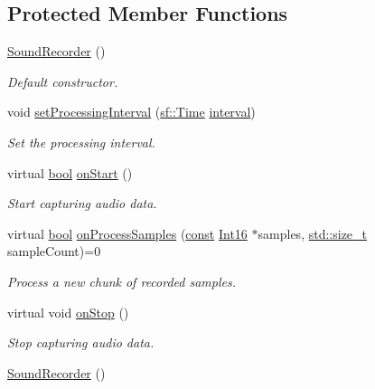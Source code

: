 \subsection*{Protected Member Functions}
\begin{DoxyCompactItemize}
\item 
\hyperlink{classsf_1_1_sound_recorder_a50ebad413c4f157408a0fa49f23212a9}{Sound\-Recorder} ()
\begin{DoxyCompactList}\small\item\em Default constructor. \end{DoxyCompactList}\item 
void \hyperlink{classsf_1_1_sound_recorder_a64895b20ed32f0e3cfaf0fa331942de6}{set\-Processing\-Interval} (\hyperlink{classsf_1_1_time}{sf\-::\-Time} \hyperlink{structinterval}{interval})
\begin{DoxyCompactList}\small\item\em Set the processing interval. \end{DoxyCompactList}\item 
virtual \hyperlink{term__entry_8h_a002004ba5d663f149f6c38064926abac}{bool} \hyperlink{classsf_1_1_sound_recorder_a7af418fb036201d3f85745bef78ce77f}{on\-Start} ()
\begin{DoxyCompactList}\small\item\em Start capturing audio data. \end{DoxyCompactList}\item 
virtual \hyperlink{term__entry_8h_a002004ba5d663f149f6c38064926abac}{bool} \hyperlink{classsf_1_1_sound_recorder_a2670124cbe7a87c7e46b4840807f4fd7}{on\-Process\-Samples} (\hyperlink{term__entry_8h_a57bd63ce7f9a353488880e3de6692d5a}{const} \hyperlink{namespacesf_a3c8e10435e2a310a7741755e66b5c94e}{Int16} $\ast$samples, \hyperlink{nc__alloc_8h_a7b60c5629e55e8ec87a4547dd4abced4}{std\-::size\-\_\-t} sample\-Count)=0
\begin{DoxyCompactList}\small\item\em Process a new chunk of recorded samples. \end{DoxyCompactList}\item 
virtual void \hyperlink{classsf_1_1_sound_recorder_aefc36138ca1e96c658301280e4a31b64}{on\-Stop} ()
\begin{DoxyCompactList}\small\item\em Stop capturing audio data. \end{DoxyCompactList}\item 
\hyperlink{classsf_1_1_sound_recorder_a50ebad413c4f157408a0fa49f23212a9}{Sound\-Recorder} ()

\end{DoxyCompactItemize}
